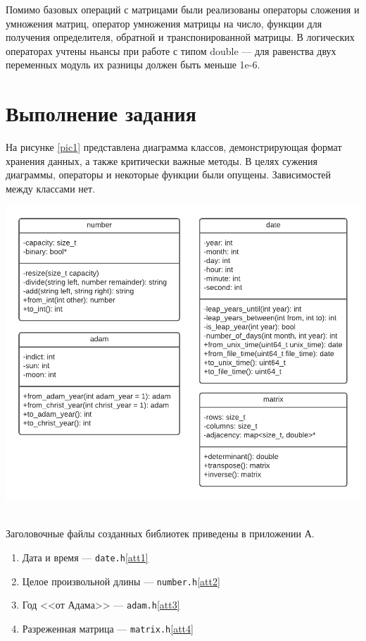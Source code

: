 \documentclass[a4paper,12pt]{article}
\begin{document}
Помимо базовых операций с матрицами были реализованы операторы сложения и умножения матриц, оператор умножения матрицы на число, функции для получения определителя, обратной и транспонированной матрицы.
В логических операторах учтены ньансы при работе с типом double — для равенства двух переменных модуль их разницы должен быть меньше 1e-6.

\cleardoublepage

\section{Выполнение задания}

На рисунке \ref{pic1} представлена диаграмма классов, демонстрирующая формат хранения данных, а также критически важные методы.
В целях сужения диаграммы, операторы и некоторые функции были опущены.
Зависимостей между классами нет.

\includegraphics{UML Class.pdf}

\label{pic1}

~\\

Заголовочные файлы созданных библиотек приведены в приложении А.

\begin{enumerate}

\item Дата и время — \verb!date.h!\ref{att1}

\item Целое произвольной длины — \verb!number.h!\ref{att2}

\item Год <<от Адама>> — \verb!adam.h!\ref{att3}

\item Разреженная матрица — \verb!matrix.h!\ref{att4}
	
\end{enumerate}
\end{document}
